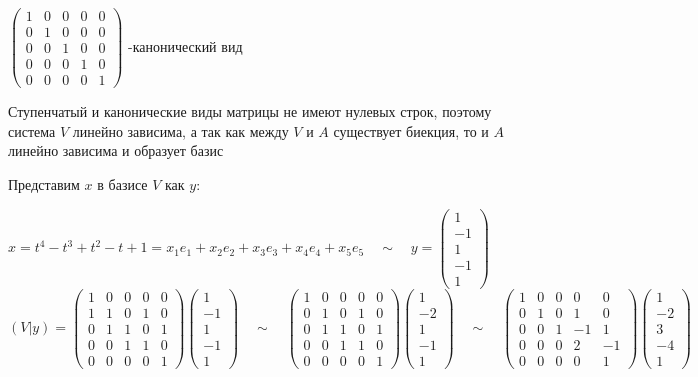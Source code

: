 \begin{enumerate}
    $\begin{pmatrix}1 & 0 & 0 & 0 & 0 \\ 0 & 1 & 0 & 0 & 0 \\ 0 & 0 & 1 & 0 & 0 \\ 0 & 0 & 0 & 1 & 0 \\ 0 & 0 & 0 & 0 & 1\end{pmatrix}$
    \quad-\quad канонический вид

    Ступенчатый и канонические виды матрицы не имеют нулевых строк, поэтому система $V$ линейно зависима,
    а так как между $V$ и $A$ существует биекция, то и $A$ линейно зависима и образует базис

    Представим $x$ в базисе $V$ как $y$:

    $x = t^4 - t^3 + t^2 - t + 1 = x_1 e_1 + x_2 e_2 + x_3 e_3 + x_4 e_4 + x_5 e_5 \quad\sim\quad y = \begin{pmatrix}1 \\ -1 \\ 1 \\ -1 \\ 1\end{pmatrix}$\\
    $(V|y) = \begin{pmatrix}1 & 0 & 0 & 0 & 0 \\ 1 & 1 & 0 & 1 & 0 \\ 0 & 1 & 1 & 0 & 1 \\ 0 & 0 & 1 & 1 & 0 \\ 0 & 0 & 0 & 0 & 1\end{pmatrix}\begin{pmatrix}1 \\ -1 \\ 1 \\ -1 \\ 1\end{pmatrix}
    \quad\sim\quad
    \begin{pmatrix}1 & 0 & 0 & 0 & 0 \\ 0 & 1 & 0 & 1 & 0 \\ 0 & 1 & 1 & 0 & 1 \\ 0 & 0 & 1 & 1 & 0 \\ 0 & 0 & 0 & 0 & 1\end{pmatrix}\begin{pmatrix}1 \\ -2 \\ 1 \\ -1 \\ 1\end{pmatrix}
    \quad\sim\quad
    \begin{pmatrix}1 & 0 & 0 & 0 & 0 \\ 0 & 1 & 0 & 1 & 0 \\ 0 & 0 & 1 & -1 & 1 \\ 0 & 0 & 0 & 2 & -1 \\ 0 & 0 & 0 & 0 & 1\end{pmatrix}\begin{pmatrix}1 \\ -2 \\ 3 \\ -4 \\ 1\end{pmatrix}$


\end{enumerate}
